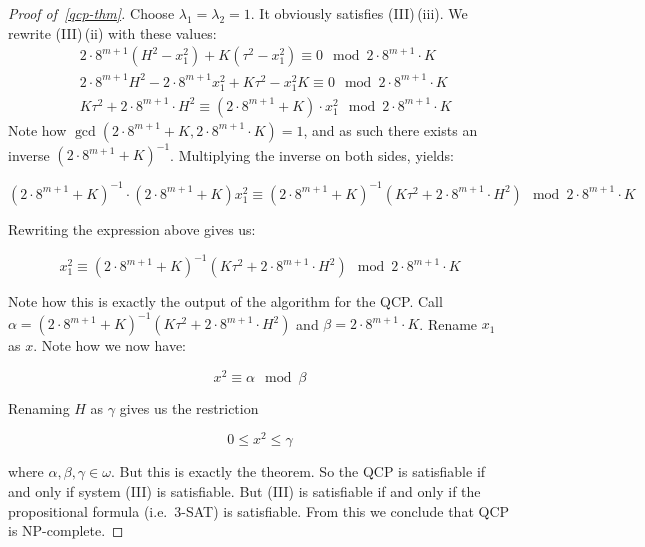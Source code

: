 \documentclass{amsart}
\theoremstyle{plain}
\begin{document}
\begin{proof}[Proof of~\autoref{qcp-thm}]
  Choose $\lambda_1=\lambda_2=1$. It obviously satisfies (III)\,(iii). We rewrite (III)\,(ii) with
  these values:
  \begin{align*}
    &2\cdot 8^{m+1}(H^2-x_1^2)+K(\tau^2-x_1^2)\equiv 0\mod 2\cdot 8^{m+1}\cdot K\\
    &2\cdot 8^{m+1}H^2-2\cdot 8^{m+1}x_1^2+K\tau^2-x_1^2K\equiv 0\mod 2\cdot 8^{m+1}\cdot K\\
    &K\tau^2+2\cdot 8^{m+1}\cdot H^2\equiv(2\cdot 8^{m+1}+K)\cdot x_1^2\mod 2\cdot 8^{m+1}\cdot K
  \end{align*}
  Note how $\gcd(2\cdot 8^{m+1}+K,2\cdot 8^{m+1}\cdot K)=1$, and as such there exists an inverse
  ${(2\cdot 8^{m+1}+K)}^{-1}$. Multiplying the inverse on both sides, yields:

  \begin{equation*}
    {(2\cdot 8^{m+1}+K)}^{-1}\cdot(2\cdot 8^{m+1}+K)x_1^2\equiv{(2\cdot 8^{m+1}+K)}^{-1}(K\tau^2+
    2\cdot 8^{m+1}\cdot H^2)\mod 2\cdot 8^{m+1}\cdot K
  \end{equation*}

  Rewriting the expression above gives us:

  \begin{equation*}
    x_1^2\equiv {(2\cdot 8^{m+1}+K)}^{-1}(K\tau^2+2\cdot 8^{m+1}\cdot H^2)\mod 2\cdot 8^{m+1}\cdot K
  \end{equation*}

  Note how this is exactly the output of the algorithm for the QCP\@. Call $\alpha={(2\cdot
  8^{m+1}+K)}^{-1}(K\tau^2+2\cdot 8^{m+1}\cdot H^2)$ and $\beta=2\cdot 8^{m+1}\cdot K$. Rename
  $x_1$ as $x$. Note how we now have:

  \begin{equation*}
    x^2\equiv\alpha\mod\beta
  \end{equation*}

  Renaming $H$ as $\gamma$ gives us the restriction

  \begin{equation*}
    0\leq x^2\leq\gamma
  \end{equation*}

  where $\alpha,\beta,\gamma\in\omega$. But this is exactly the theorem. So the QCP is satisfiable
  if and only if system (III) is satisfiable. But (III) is satisfiable if and only if the
  propositional formula (i.e.\ 3-SAT) is satisfiable. From this we conclude that QCP is
  NP-complete.
\end{proof}
\end{document}
